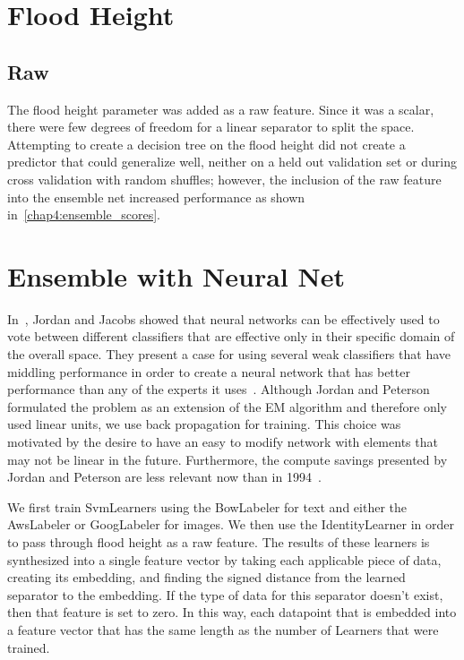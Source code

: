 \section{Flood Height}
\subsection{Raw}
The flood height parameter was added as a raw feature. Since it was a scalar,
there were few degrees of freedom for a linear separator to split the space.
Attempting to create a decision tree on the flood height did not create a
predictor that could generalize well, neither on a held out validation set or
during cross validation with random shuffles; however, the inclusion of the raw
feature into the ensemble net increased performance as shown
in~\ref{chap4:ensemble_scores}.

\section{Ensemble with Neural Net}
In~\cite{jordanHierarchicalMixturesExperts1994}, Jordan and Jacobs showed that
neural networks can be effectively used to vote between different classifiers
that are effective only in their specific domain of the overall space. They present a
case for using several weak classifiers that have middling performance in order
to create a neural network that has better performance than any of the experts
it uses~\cite{jordanHierarchicalMixturesExperts1994}. Although Jordan and
Peterson formulated the problem as an extension of the EM algorithm and
therefore only used linear units, we use back propagation for training. This
choice was motivated by the desire to have an easy to modify network with
elements that may not be linear in the future. Furthermore, the compute savings
presented by Jordan and Peterson are less relevant now than in 1994~\cite{bishopPatternRecognitionMachine2006}.

We first train SvmLearners using the BowLabeler for text and either the AwsLabeler or
GoogLabeler for images. We then use the IdentityLearner in order to pass through
flood height as a raw feature. The results of these learners is synthesized into
a single feature vector by taking each applicable piece of data, creating its
embedding, and finding the signed distance from the learned separator to the
embedding. If the type of data for this separator doesn't exist, then that
feature is set to zero. In this way, each datapoint that is embedded into a
feature vector that has the same length as the number of Learners that were
trained.

